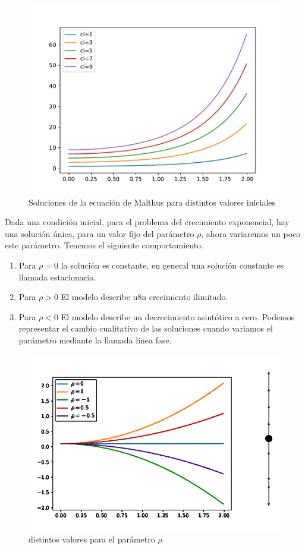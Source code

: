 \begin{figure}[H]
    \centering
    \includegraphics[scale=0.85]{exponenciales1.pdf}
    \caption{Soluciones de la ecuación de Malthus para distintos valores iniciales}
    \label{fig:exposci}
\end{figure}

Dada una condición inicial, para el problema del crecimiento exponencial, hay una solución única, para un valor fijo del parámetro $\rho$, ahora variaremos un poco este parámetro. Tenemos el siguiente comportamiento. 
\begin{enumerate}
    \item Para $\rho=0$ la solución es constante, en general una solución constante es llamada estacionaria.
    \item Para $\rho > 0$ El modelo describe u8n crecimiento ilimitado.
    \item Para $\rho<0$ El modelo describe un decrecimiento asintótico a cero. Podemos representar el cambio cualitativo de las soluciones cuando variamos  el parámetro mediante la llamada linea fase.
\end{enumerate}

\begin{figure}[H]
    \centering
    \includegraphics[scale=0.85]{exponenxiales2.pdf}
    \caption{distintos valores para el parámetro $\rho$}
    \label{fig:exposrho}
\end{figure}


